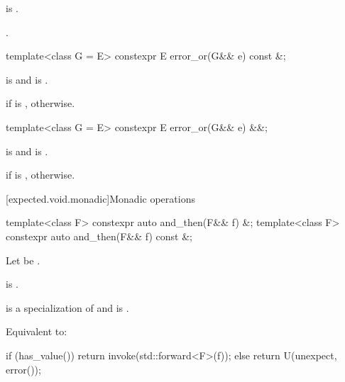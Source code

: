 \begin{itemdescr}
\pnum
\hardexpects
{} is .

\pnum
\returns
{}.
\end{itemdescr}

%
\begin{itemdecl}
template<class G = E> constexpr E error_or(G&& e) const &;
\end{itemdecl}

\begin{itemdescr}
\pnum
\mandates
{} is  and
 is .

\pnum
\returns
{} if  is ,
 otherwise.
\end{itemdescr}

%
\begin{itemdecl}
template<class G = E> constexpr E error_or(G&& e) &&;
\end{itemdecl}

\begin{itemdescr}
\pnum
\mandates
{} is  and
 is .

\pnum
\returns
{} if  is ,
 otherwise.
\end{itemdescr}

[expected.void.monadic]{Monadic operations}

%
\begin{itemdecl}
template<class F> constexpr auto and_then(F&& f) &;
template<class F> constexpr auto and_then(F&& f) const &;
\end{itemdecl}

\begin{itemdescr}
\pnum
Let  be .

\pnum
\constraints
{} is .

\pnum
\mandates
{} is a specialization of  and
 is .

\pnum
\effects
Equivalent to:
\begin{codeblock}
if (has_value())
  return invoke(std::forward<F>(f));
else
  return U(unexpect, error());
\end{codeblock}
\end{itemdescr}

